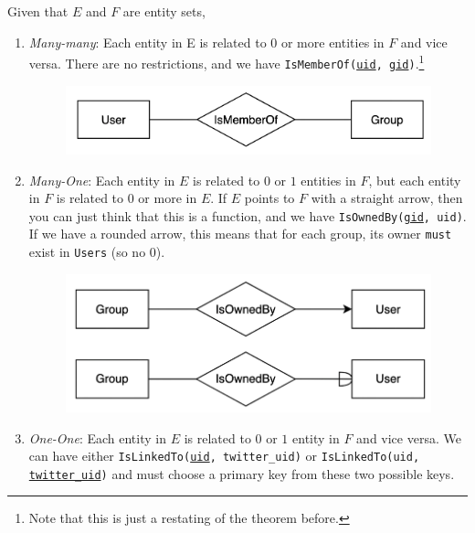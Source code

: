 \documentclass{article}
\begin{document}
      \begin{definition}
        Given that $E$ and $F$ are entity sets, 
        \begin{enumerate}
          \item \textit{Many-many}: Each entity in E is related to $0$ or more entities in $F$ and vice versa. There are no restrictions, and we have \texttt{IsMemberOf(\underline{uid}, \underline{gid})}.\footnote{Note that this is just a restating of the theorem before.} 

          \begin{figure}[H]
            \centering 
            \includegraphics[scale=0.3]{img/ismember.png}
            \caption{} 
            \label{fig:ismember}
          \end{figure}

          \item \textit{Many-One}: Each entity in $E$ is related to $0$ or $1$ entities in $F$, but each entity in $F$ is related to $0$ or more in $E$. If $E$ points to $F$ with a straight arrow, then you can just think that this is a function, and we have \texttt{IsOwnedBy(\underline{gid}, uid)}. If we have a rounded arrow, this means that for each group, its owner \texttt{must} exist in \texttt{Users} (so no $0$). 

          \begin{figure}[H]
            \centering 
            \includegraphics[scale=0.3]{img/isowned.png}
            \caption{} 
            \label{fig:isowned}
          \end{figure}

        \item \textit{One-One}: Each entity in $E$ is related to $0$ or $1$ entity in $F$ and vice versa. We can have either \texttt{IsLinkedTo(\underline{uid}, twitter\_uid)} or \texttt{IsLinkedTo(uid, \underline{twitter\_uid})} and must choose a primary key from these two possible keys.  


\end{enumerate}
\end{definition}
\end{document}
